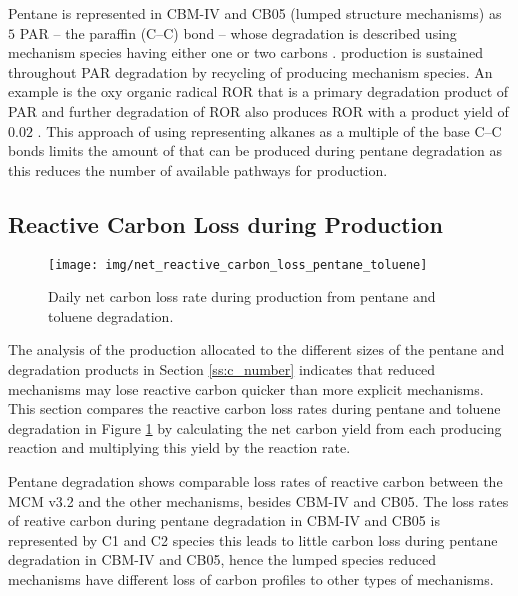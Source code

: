 Pentane is represented in CBM-IV and CB05 (lumped structure mechanisms) as $5$ PAR -- the paraffin (C--C) bond -- whose degradation is described using mechanism species having either one or two carbons \citep{Gery:1989, Yarwood:2005}. 
 production is sustained throughout PAR degradation by recycling of  producing mechanism species.
An example is the oxy organic radical ROR that is a primary degradation product of PAR and further degradation of ROR also produces ROR with a product yield of $0.02$ \citep{Gery:1989}.
This approach of using representing alkanes as a multiple of the base C--C bonds limits the amount of  that can be produced during pentane degradation as this reduces the number of available pathways for  production.

\subsection[Reactive Carbon Loss during Ox Production]{Reactive Carbon Loss during  Production} \label{ss:carbon_loss}

\begin{figure}
    \centering
    \texttt{[image: img/net\_reactive\_carbon\_loss\_pentane\_toluene]}
    \vspace{0mm}
    \caption{Daily net carbon loss rate during  production from pentane and toluene degradation.}
    \vspace{-4mm}
    \label{f:net_carbon_loss}
\end{figure}

The analysis of the  production allocated to the different sizes of the pentane and degradation products in Section \ref{ss:c_number} indicates that reduced mechanisms may lose reactive carbon quicker than more explicit mechanisms.
This section compares the reactive carbon loss rates during pentane and toluene degradation in Figure \ref{f:net_carbon_loss} by calculating the net carbon yield from each  producing reaction and multiplying this yield by the reaction rate.

Pentane degradation shows comparable loss rates of reactive carbon between the MCM v3.2 and the other mechanisms, besides CBM-IV and CB05.
The loss rates of reative carbon during pentane degradation in CBM-IV and CB05 is represented by C1 and C2 species this leads to little carbon loss during pentane degradation in CBM-IV and CB05, hence the lumped species reduced mechanisms have different loss of carbon profiles to other types of mechanisms.

